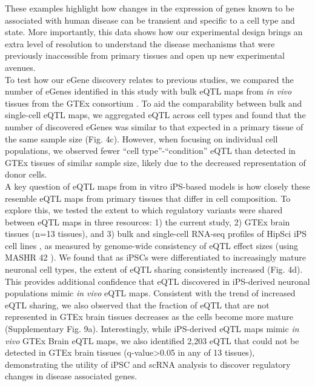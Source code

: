 These examples highlight how changes in the expression of genes known to be associated with human disease can be transient and specific to a cell type and state. More importantly, this data shows how our experimental design brings an extra level of resolution to understand the disease mechanisms that were previously inaccessible from primary tissues and open up new experimental avenues.\\

To test how our eGene discovery relates to previous studies, we compared the number of eGenes identified in this study with bulk eQTL maps from \textit{in vivo} tissues from the GTEx consortium \cite{gtex2017genetic}. 
To aid the comparability between bulk and single-cell eQTL maps,
we aggregated eQTL across cell types and found that the number of discovered eGenes
was similar to that expected in a primary tissue of the same sample size (Fig. 4c). However, when focusing on individual cell populations, we observed fewer “cell type”-“condition” eQTL than detected in GTEx tissues of similar sample size, likely due to the decreased representation of donor cells.\\

A key question of eQTL maps from in vitro iPS-based models is how closely these resemble eQTL maps from primary tissues that differ in cell composition. 
To explore this, we tested the extent to which regulatory variants were shared between eQTL maps in three resources: 1) the current study, 2) GTEx brain tissues (n=13 tissues), and 3) bulk and single-cell RNA-seq profiles of HipSci iPS cell lines \cite{bonder2019systematic, cuomo2020single}, as measured by genome-wide consistency of eQTL effect sizes (using MASHR 42 \cite{urbut2019flexible}). 
We found that as iPSCs were differentiated to increasingly mature neuronal cell types, the extent of eQTL sharing consistently increased (Fig. 4d). 
This provides additional confidence that eQTL discovered in iPS-derived neuronal
populations mimic \textit{in vivo} eQTL maps. 
Consistent with the trend of increased eQTL sharing, we also observed that the fraction of eQTL that are not represented in GTEx brain tissues decreases as the cells become more mature (Supplementary Fig. 9a). 
Interestingly, while iPS-derived eQTL maps mimic \textit{in vivo} GTEx Brain eQTL maps, we also identified 2,203 eQTL that could not be detected in GTEx brain tissues (q-value>0.05 in any of 13 tissues), demonstrating the utility of iPSC and scRNA analysis to discover regulatory changes in disease associated genes.\\

